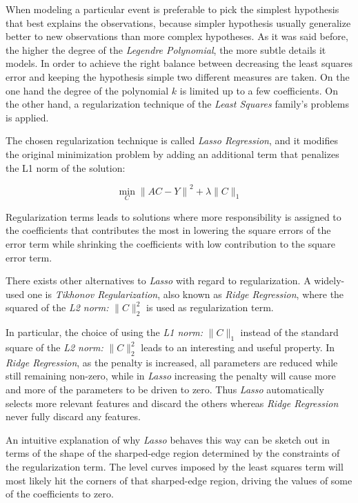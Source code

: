 When modeling a particular event is preferable to pick the simplest hypothesis that best
explains the observations, because simpler hypothesis usually generalize better to new
observations than more complex hypotheses. As it was said before, the higher the
degree of the \textit{Legendre Polynomial},
the more subtle details it models. In order to achieve the right balance between decreasing
the least squares error and keeping the hypothesis simple two different measures are taken.
On the one hand the degree of the polynomial $k$ is limited up to a few coefficients.
On the other hand, a regularization technique of the \textit{Least Squares} family's
problems is applied.

The chosen regularization technique is called \textit{Lasso Regression}, and it modifies the
original minimization problem by adding an additional term that penalizes the L1 norm of the
solution:

\begin{equation}
  \min_{C} {\| AC - Y \|}^{2} + \lambda \| C \|_{1}
\end{equation}

Regularization terms leads to solutions where more responsibility is assigned to the
coefficients that contributes the most in lowering the square errors of the error term while
shrinking the coefficients with low contribution to the square error term.

There exists other alternatives to \textit{Lasso} with regard to regularization.
A widely-used one is \textit{Tikhonov Regularization}, also known as \textit{Ridge Regression},
where the squared of the \textit{L2 norm:} $\| C \|_{2}^{2}$ is used as regularization term.

In particular, the
choice of using the \textit{L1 norm:} $\| C \|_{1}$ instead of the standard
square of the \textit{L2 norm:} $\| C \|_{2}^{2}$ leads to an interesting and useful property.
In \textit{Ridge Regression}, as the penalty is increased, all parameters are reduced while
still remaining non-zero, while in \textit{Lasso} increasing the penalty will cause more and
more of the parameters to be driven to zero. Thus \textit{Lasso} automatically selects more
relevant features and discard the others whereas \textit{Ridge Regression} never fully
discard any features.

An intuitive explanation of why \textit{Lasso} behaves this way can be sketch out in terms
of the shape of the sharped-edge region
determined by the constraints of the regularization term.
The level curves imposed by the least squares term will most likely hit the corners of
that sharped-edge region, driving the values of some of the coefficients to zero.

